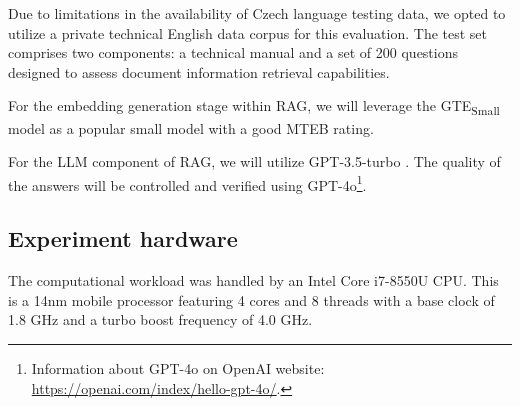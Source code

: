 Due to limitations in the availability of Czech language testing data, we opted to utilize a private technical English data corpus for this evaluation.
The test set comprises two components: a technical manual and a set of 200 questions designed to assess document information retrieval capabilities.

For the embedding generation stage within \ac{RAG}, we will leverage the GTE\textsubscript{Small} model as a popular small model with a good \ac{MTEB} rating.

For the \ac{LLM} component of \ac{RAG}, we will utilize GPT-3.5-turbo \cite{openai2023gpt35turbo}.
The quality of the answers will be controlled and verified using GPT-4o\footnote{Information about GPT-4o on OpenAI website: \url{https://openai.com/index/hello-gpt-4o/}.}.


\subsection{Experiment hardware}
The computational workload was handled by an Intel Core i7-8550U CPU.
This is a 14nm mobile processor featuring 4 cores and 8 threads with a base clock of 1.8 GHz and a turbo boost frequency of 4.0 GHz.




